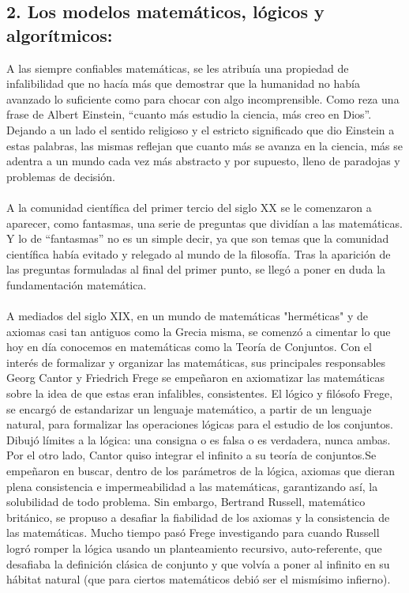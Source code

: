 \documentclass[12pt]{article}
\begin{document}
\begin{multicols}{2}
\section*{2. Los modelos matemáticos, lógicos y algorítmicos:}
A las siempre confiables matemáticas, se les atribuía una propiedad de infalibilidad que no hacía más que demostrar que la humanidad no había avanzado lo suficiente como para chocar con algo incomprensible. Como reza una frase de Albert Einstein, “cuanto más estudio la ciencia, más creo en Dios”. Dejando a un lado el sentido religioso y el estricto significado que dio Einstein a estas palabras, las mismas reflejan que cuanto más se avanza en la ciencia, más se adentra a un mundo cada vez más abstracto y por supuesto, lleno de paradojas y problemas de decisión.\\\\
\indent \cite{MT}A la comunidad científica del primer tercio del siglo XX se le comenzaron a aparecer, como fantasmas, una serie de preguntas que dividían a las matemáticas. Y lo de “fantasmas” no es un simple decir, ya que son temas que la comunidad científica había evitado y relegado al mundo de la filosofía. Tras la aparición de las preguntas formuladas al final del primer punto, se llegó a poner en duda la fundamentación matemática.\\\\
\indent A mediados del siglo XIX, en un mundo de matemáticas "herméticas" y de axiomas casi tan antiguos como la Grecia misma, se comenzó a cimentar lo que hoy en día conocemos en matemáticas como la Teoría de Conjuntos.\cite{CT} Con el interés de formalizar y organizar las matemáticas, sus principales responsables Georg Cantor y Friedrich Frege se empeñaron en axiomatizar las matemáticas sobre la idea de que estas eran infalibles, consistentes. El lógico y filósofo Frege, se encargó de estandarizar un lenguaje matemático, a partir de un lenguaje natural, para formalizar las operaciones lógicas para el estudio de los conjuntos. Dibujó límites a la lógica: una consigna o es falsa o es verdadera, nunca ambas. Por el otro lado, Cantor quiso integrar el infinito a su teoría de conjuntos.Se empeñaron en buscar, dentro de los parámetros de la lógica, axiomas que dieran plena consistencia e impermeabilidad a las matemáticas, garantizando así, la solubilidad de todo problema. Sin embargo,  Bertrand Russell, matemático británico, se propuso a desafiar la fiabilidad de los axiomas y la consistencia de las matemáticas. Mucho tiempo pasó Frege investigando para cuando Russell logró romper la lógica usando un planteamiento recursivo, auto-referente, que desafiaba la definición clásica de conjunto y que volvía a poner al infinito en su hábitat natural (que para ciertos matemáticos debió ser el mismísimo infierno).\\\\

\end{multicols}
\end{document}
